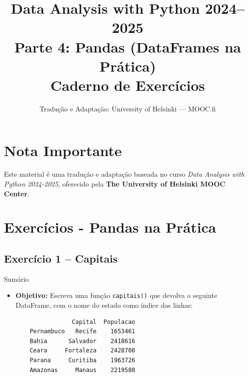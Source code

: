 \documentclass[11pt,a4paper]{article}
\title{\textbf{Data Analysis with Python 2024--2025}\\Parte 4: Pandas (DataFrames na Prática)\\\large Caderno de Exercícios}
\author{Tradução e Adaptação: University of Helsinki --- MOOC.fi}
\date{}
\begin{document}
\maketitle

\section*{Nota Importante}
Este material é uma tradução e adaptação baseada no curso \textit{Data Analysis with Python 2024-2025}, oferecido pela \textbf{The University of Helsinki MOOC Center}.

\tableofcontents
\newpage

\section{Exercícios - Pandas na Prática}

\subsection*{Exercício 1 -- Capitais}
\begin{exercicio}{Sumário}
\begin{itemize}
    \item \textbf{Objetivo:} Escreva uma função \texttt{capitais()} que devolva o seguinte DataFrame, com o nome do estado como índice das linhas:
    \begin{verbatim}
                Capital  Populacao
    Pernambuco   Recife    1653461
    Bahia      Salvador    2418616
    Ceara     Fortaleza    2428708
    Parana     Curitiba    1963726
    Amazonas     Manaus    2219580
    \end{verbatim}
\end{itemize}
\end{exercicio}
\end{document}
